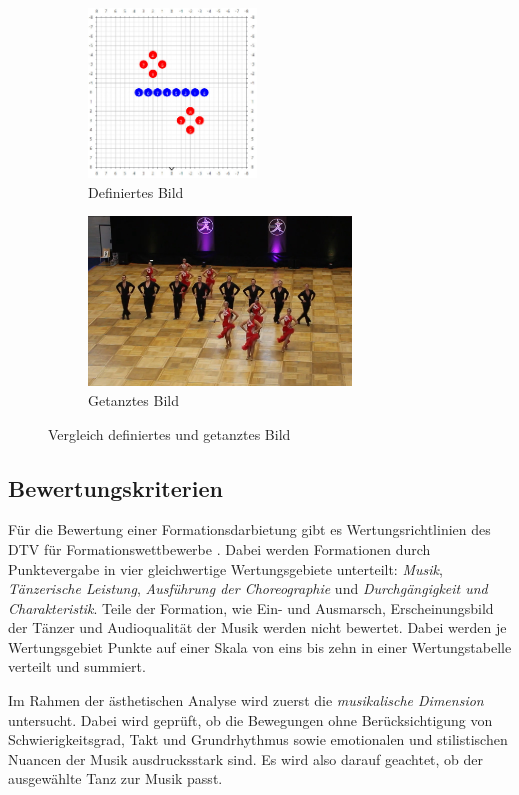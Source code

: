 \documentclass[
  ngerman,
  a4paper,  %
  twoside,  %
  bibliography=totoc,
  headsepline,
  cleardoublepage=empty,
  parskip=half,
  draft=false
]{scrbook}
\begin{document}
\begin{figure}
  \begin{subfigure}{.5\textwidth}
    \includegraphics[height=4.5cm]{graphics/definiertes_Bild.png}
    \caption{Definiertes Bild}
    \label{fig:tanzfläche_choreo}
  \end{subfigure}
  \begin{subfigure}{.5\textwidth}
    \includegraphics[height=4.5cm]{graphics/getanztes_bild.png}
    \caption{Getanztes Bild}
  \end{subfigure}
  \caption{Vergleich definiertes und getanztes Bild}
  \label{fig:def_bild}
\end{figure}


\subsection{Bewertungskriterien \label{chp:bewertungskriterien}}
Für die Bewertung einer Formationsdarbietung gibt es Wertungsrichtlinien des DTV für Formationswettbewerbe \cite{wertungsrichtlinien}.
Dabei werden Formationen durch Punktevergabe in vier gleichwertige Wertungsgebiete unterteilt: \textit{Musik}, \textit{Tänzerische Leistung}, \textit{Ausführung der Choreographie} und \textit{Durchgängigkeit und Charakteristik}.
Teile der Formation, wie Ein- und Ausmarsch, Erscheinungsbild der Tänzer und Audioqualität der Musik werden nicht bewertet.
Dabei werden je Wertungsgebiet Punkte auf einer Skala von eins bis zehn in einer Wertungstabelle verteilt und summiert.

Im Rahmen der ästhetischen Analyse wird zuerst die \textit{musikalische Dimension} untersucht.
Dabei wird geprüft, ob die Bewegungen ohne Berücksichtigung von Schwierigkeitsgrad, Takt und Grundrhythmus sowie emotionalen und stilistischen Nuancen der Musik ausdrucksstark sind.
Es wird also darauf geachtet, ob der ausgewählte Tanz zur Musik passt.
\end{document}
